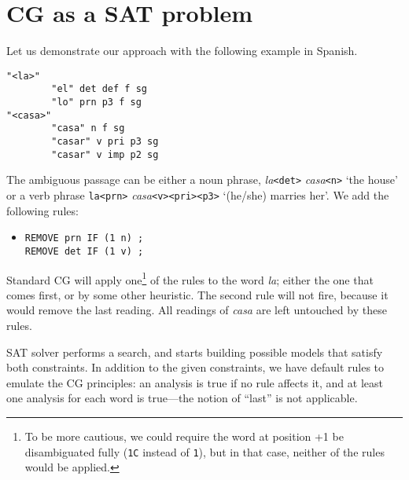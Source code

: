 \documentclass[11pt]{article}
\begin{document}


\section{CG as a SAT problem}
Let us demonstrate our approach with the following example in Spanish.

\begin{verbatim}
"<la>"
        "el" det def f sg
        "lo" prn p3 f sg
"<casa>"
        "casa" n f sg
        "casar" v pri p3 sg
        "casar" v imp p2 sg
\end{verbatim}

The ambiguous passage can be either a noun phrase, \emph{la}\texttt{<det>} \emph{casa}\texttt{<n>} 
`the house'  or a verb phrase \texttt{la<prn>}  \emph{casa}\texttt{<v><pri><p3>} `(he/she) marries her'. 
We add the following rules:

\begin{itemize}
\item [] \texttt{REMOVE prn IF (1 n) ;} \\
             \texttt{REMOVE det IF (1 v) ;}
\end{itemize}

Standard CG will apply one\footnote{To be more cautious, we could require the word at position +1 be disambiguated fully (\texttt{1C} instead of \texttt{1}), but in that case, 
neither of the rules would be applied.} of the rules to the word \emph{la}; 
either the one that comes first, or by some other heuristic. 
The second rule will not fire, because it would remove the last reading. 
All readings of \emph{casa} are left untouched by these rules.

SAT solver performs a search, 
and starts building possible models that satisfy both constraints. 
In addition to the given constraints, we have default rules to emulate
the CG principles: an analysis is true if no rule affects it,
and at least one analysis for each word is true---the notion of
``last'' is not applicable.
\end{document}
